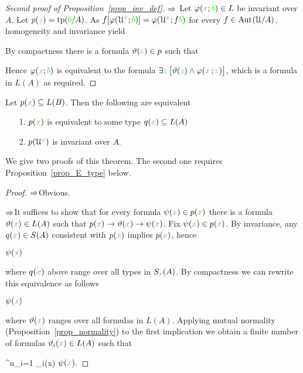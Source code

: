 \begin{proof}[Second proof of Proposition~\ref{prop_inv_def}] 
   $\Rightarrow$ 
   Let $\varphi({\color{brown} x};{\color{green} b})\in L$ be invariant over $A$.
   Let $p({\color{green} z})={\rm tp}({\color{green} b}/A)$.
   As $f[\varphi(\EuScript U^{\color{brown} x};{\color{green} b})]=\varphi(\EuScript U^{\color{brown} x};f{\color{green} b})$ for every $f\in{\rm Aut\kern.15ex}(\EuScript U/A)$, homogeneity and invariance yield
   

By compactness there is a formula $\vartheta({\color{green} z})\in p$ such that 


Hence  $\varphi({\color{brown} x};{\color{green} b})$ is equivalent to the formula $\exists {\color{green}z}\,\big[\vartheta({\color{green} z})\wedge\varphi({\color{brown} x}\,;{\color{green} z})\big]$, which is a formula in $L(A)$ as required.
\end{proof}

\begin{proposition}\label{prop_inv_types}
Let $p({\color{brown} x})\subseteq L(B)$.
Then the following are equivalent
\begin{itemize}
 \item[1.] $p({\color{brown} x})$ is equivalent to some type $q({\color{brown} x})\subseteq L(A)$
 \item[2.] $p(\EuScript U^{\color{brown} x})$ is invariant over $A$.
\end{itemize}
\end{proposition}

We give two proofs of this theorem.  The second one requires Proposition~\ref{prop_E_type} below.

\vspace*{-\parskip}
\begin{proof}
$\Rightarrow$\quad Obvious. 

$\Rightarrow$\quad It suffices to show that for every formula $\psi({\color{brown} x})\in p({\color{brown} x})$ there is a formula $\vartheta({\color{brown} x})\in L(A)$ such that $p({\color{brown} x})\rightarrow\vartheta({\color{brown} x})\rightarrow\psi({\color{brown} x})$. Fix $\psi({\color{brown} x})\in p({\color{brown} x})$. By invariance, any $q({\color{brown} x})\in S(A)$ consistent with $p({\color{brown} x})$ implies $p({\color{brown} x})$, hence

\medrel{\imp}$\psi({\color{brown} x})$

where $q({\color{brown} x})$ above range over all types in $S_{\color{brown} x}(A)$. By compactness we can rewrite this equivalence as follows

\medrel{\imp}$\psi({\color{brown} x})$

where $\vartheta({\color{brown} x})$ ranges over all formulas in $L(A)$.
Applying mutual normality (Proposition~\ref{prop_normality}) to the first implication we obtain a finite number of formulas $\vartheta_i({\color{brown} x})\in L(A)$ such that 

{\imp}
{\bigvee^n_{i=1} \theta_i({\mr x})}
\medrel{\imp}
$\psi({\color{brown} x}).$
\end{proof}

